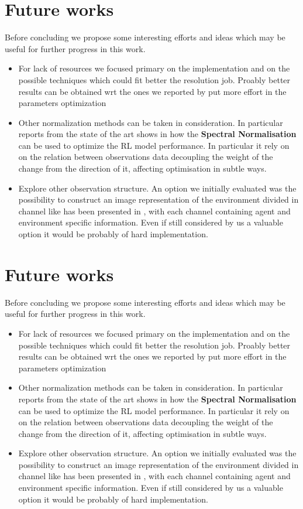 \section{Future works}
Before concluding we propose some interesting efforts and ideas which may be useful for further progress in this work.
\begin{itemize}
	\item For lack of resources we focused primary on the implementation and on the possible techniques which could fit better the resolution job. Proably better results can be obtained wrt the ones we reported by put more effort in the parameters optimization  
	\item Other normalization methods can be taken in consideration. In particular reports from the state of the art shows in \cite{spectralNorm} how the \textbf{Spectral Normalisation} can be used to optimize the RL model performance. In particular it rely on on the relation between observations data decoupling the weight of the change from the direction of it, affecting optimisation in subtle ways.
	\item Explore other observation structure. An option we initially evaluated was the possibility to construct an image representation of the environment divided in channel like has been presented in \cite{graphObserv},  with each channel containing agent and environment specific information. Even if still considered by us a valuable option it would be probably of hard implementation.
\end{itemize}
\section{Future works}
Before concluding we propose some interesting efforts and ideas which may be useful for further progress in this work.
\begin{itemize}
    \item For lack of resources we focused primary on the implementation and on the possible techniques which could fit better the resolution job. Proably better results can be obtained wrt the ones we reported by put more effort in the parameters optimization  
	\item Other normalization methods can be taken in consideration. In particular reports from the state of the art shows in \cite{spectralNorm} how the \textbf{Spectral Normalisation} can be used to optimize the RL model performance. In particular it rely on on the relation between observations data decoupling the weight of the change from the direction of it, affecting optimisation in subtle ways.
	\item Explore other observation structure. An option we initially evaluated was the possibility to construct an image representation of the environment divided in channel like has been presented in \cite{graphObserv},  with each channel containing agent and environment specific information. Even if still considered by us a valuable option it would be probably of hard implementation.
\end{itemize}
